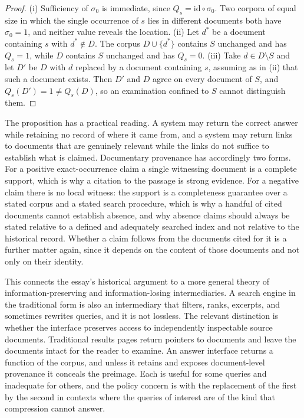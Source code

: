 \documentclass[11pt]{article}
\theoremstyle{remark}
\begin{document}
\begin{proof}
(i) Sufficiency of $\sigma_0$ is immediate, since $Q_s=\mathrm{id}\circ\sigma_0$. Two corpora of equal size in which the single occurrence of $s$ lies in different documents both have $\sigma_0=1$, and neither value reveals the location. (ii) Let $d^{*}$ be a document containing $s$ with $d^{*}\notin D$. The corpus $D\cup\{d^{*}\}$ contains $S$ unchanged and has $Q_s=1$, while $D$ contains $S$ unchanged and has $Q_s=0$. (iii) Take $d\in D\setminus S$ and let $D'$ be $D$ with $d$ replaced by a document containing $s$, assuming as in (ii) that such a document exists. Then $D'$ and $D$ agree on every document of $S$, and $Q_s(D')=1\ne Q_s(D)$, so an examination confined to $S$ cannot distinguish them.
\end{proof}

The proposition has a practical reading. A system may return the correct answer while retaining no record of where it came from, and a system may return links to documents that are genuinely relevant while the links do not suffice to establish what is claimed. Documentary provenance has accordingly two forms. For a positive exact-occurrence claim a single witnessing document is a complete support, which is why a citation to the passage is strong evidence. For a negative claim there is no local witness: the support is a completeness guarantee over a stated corpus and a stated search procedure, which is why a handful of cited documents cannot establish absence, and why absence claims should always be stated relative to a defined and adequately searched index and not relative to the historical record. Whether a claim follows from the documents cited for it is a further matter again, since it depends on the content of those documents and not only on their identity.

This connects the essay's historical argument to a more general theory of information-preserving and information-losing intermediaries. A search engine in the traditional form is also an intermediary that filters, ranks, excerpts, and sometimes rewrites queries, and it is not lossless. The relevant distinction is whether the interface preserves access to independently inspectable source documents. Traditional results pages return pointers to documents and leave the documents intact for the reader to examine. An answer interface returns a function of the corpus, and unless it retains and exposes document-level provenance it conceals the preimage. Each is useful for some queries and inadequate for others, and the policy concern is with the replacement of the first by the second in contexts where the queries of interest are of the kind that compression cannot answer.
\end{document}
